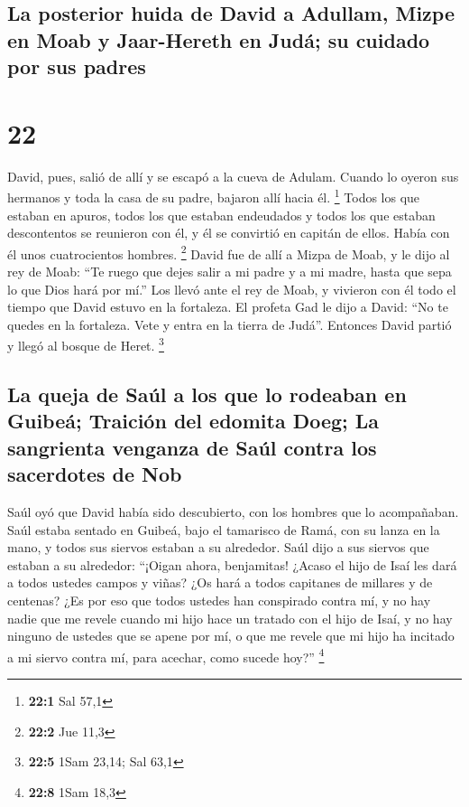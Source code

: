 \hypertarget{la-posterior-huida-de-david-a-adullam-mizpe-en-moab-y-jaar-hereth-en-juduxe1-su-cuidado-por-sus-padres}{%
\subsection{La posterior huida de David a Adullam, Mizpe en Moab y
Jaar-Hereth en Judá; su cuidado por sus
padres}\label{la-posterior-huida-de-david-a-adullam-mizpe-en-moab-y-jaar-hereth-en-juduxe1-su-cuidado-por-sus-padres}}

\hypertarget{section-21}{%
\section{22}\label{section-21}}

 David, pues, salió de allí y se escapó a la cueva de
Adulam. Cuando lo oyeron sus hermanos y toda la casa de su padre,
bajaron allí hacia él. \footnote{\textbf{22:1} Sal 57,1} 
Todos los que estaban en apuros, todos los que estaban endeudados y
todos los que estaban descontentos se reunieron con él, y él se
convirtió en capitán de ellos. Había con él unos cuatrocientos hombres.
\footnote{\textbf{22:2} Jue 11,3}  David fue de allí a
Mizpa de Moab, y le dijo al rey de Moab: ``Te ruego que dejes salir a mi
padre y a mi madre, hasta que sepa lo que Dios hará por mí.''
 Los llevó ante el rey de Moab, y vivieron con él todo el
tiempo que David estuvo en la fortaleza.  El profeta Gad
le dijo a David: ``No te quedes en la fortaleza. Vete y entra en la
tierra de Judá''. Entonces David partió y llegó al bosque de Heret.
\footnote{\textbf{22:5} 1Sam 23,14; Sal 63,1}

\hypertarget{la-queja-de-sauxfal-a-los-que-lo-rodeaban-en-guibeuxe1-traiciuxf3n-del-edomita-doeg-la-sangrienta-venganza-de-sauxfal-contra-los-sacerdotes-de-nob}{%
\subsection{La queja de Saúl a los que lo rodeaban en Guibeá; Traición
del edomita Doeg; La sangrienta venganza de Saúl contra los sacerdotes
de
Nob}\label{la-queja-de-sauxfal-a-los-que-lo-rodeaban-en-guibeuxe1-traiciuxf3n-del-edomita-doeg-la-sangrienta-venganza-de-sauxfal-contra-los-sacerdotes-de-nob}}

 Saúl oyó que David había sido descubierto, con los
hombres que lo acompañaban. Saúl estaba sentado en Guibeá, bajo el
tamarisco de Ramá, con su lanza en la mano, y todos sus siervos estaban
a su alrededor.  Saúl dijo a sus siervos que estaban a su
alrededor: ``¡Oigan ahora, benjamitas! ¿Acaso el hijo de Isaí les dará a
todos ustedes campos y viñas? ¿Os hará a todos capitanes de millares y
de centenas?  ¿Es por eso que todos ustedes han conspirado
contra mí, y no hay nadie que me revele cuando mi hijo hace un tratado
con el hijo de Isaí, y no hay ninguno de ustedes que se apene por mí, o
que me revele que mi hijo ha incitado a mi siervo contra mí, para
acechar, como sucede hoy?'' \footnote{\textbf{22:8} 1Sam 18,3}

